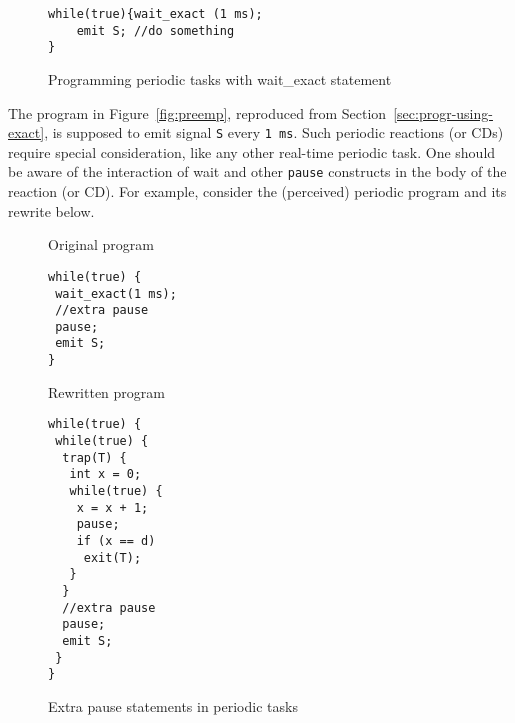 


\begin{figure}[h!]
	\vspace{-10pt}
        \begin{lstlisting}[style=sysj,basicstyle=\footnotesize\ttfamily,morekeywords={emit,trap,pause,exit,wait_exact}]
while(true){wait_exact (1 ms); 
	emit S; //do something
}
 \end{lstlisting}
  \caption{Programming periodic tasks with wait\_exact statement}
  \label{fig:periodic}
	\vspace{-10pt}
\end{figure}

The program in Figure~\ref{fig:preemp}, reproduced from
Section~\ref{sec:progr-using-exact}, is supposed to emit signal
\texttt{S} every \texttt{1 ms}. Such periodic reactions (or CDs) require
special consideration, like any other real-time periodic task. One
should be aware of the interaction of wait and other \texttt{pause}
constructs in the body of the reaction (or CD). For example, consider
the (perceived) periodic program and its rewrite below.

\begin{figure}[h!]
  \centering
  \begin{SubFloat}{\label{pp:a}Original program}
    \centering
			\begin{lstlisting}[style=sysj,basicstyle=\footnotesize\ttfamily,morekeywords={emit,trap,pause,exit,wait_exact}]
while(true) {
 wait_exact(1 ms);
 //extra pause
 pause;
 emit S;
}
\end{lstlisting}
\end{SubFloat}
\hspace{9pt}
  \begin{SubFloat}{\label{pp:b}Rewritten program}
			\begin{lstlisting}[style=sysj,basicstyle=\footnotesize\ttfamily,morekeywords={emit,trap,pause,exit,delay}]
while(true) {
 while(true) { 
  trap(T) {
   int x = 0;
   while(true) {
    x = x + 1;
    pause;
    if (x == d)
     exit(T);
   }
  }
  //extra pause
  pause;
  emit S;
 }
}
\end{lstlisting}
  \end{SubFloat}
\caption{Extra pause statements in periodic tasks}
  \label{fig:periodic2}
\end{figure}

